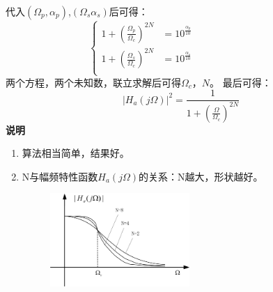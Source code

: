 \documentclass[notheorems,compress,mathserif,table]{beamer}
\begin{document}
\begin{frame}[allowframebreaks]
\begin{enumerate}
    代入$(\Omega_{p},\alpha_{p})$,$(\Omega_{s}\alpha_{s})$后可得：
    $$
    \left\{ \begin{aligned}
        1+\left(\frac{\Omega_{p}}{\Omega_{c}}\right)^{2N} &= 10^{\frac{\alpha_{p}}{10}}\\
        1+\left(\frac{\Omega_{s}}{\Omega_{c}}\right)^{2N} &= 10^{\frac{\alpha_{s}}{10}}
        \quad\quad\quad\quad\quad\quad\quad\quad\\
    \end{aligned} \right.
    $$
    两个方程，两个未知数，联立求解后可得$\Omega_{c}$，$N$。
    最后可得：
    $$|H_{a}(j\Omega)|^{2}= \frac{1}{1+(\frac{\Omega}{\Omega_{c}})^{2N}}$$
    \newpage
    \textbf{说明}
    \begin{enumerate}
      \item 算法相当简单，结果好。
      \item N与幅频特性函数$H_{a}(j\Omega)$的关系：N越大，形状越好。
        \begin{figure}[h]
          \centering
          \includegraphics[width=0.5\textwidth]{fig7_btwsdtfdtx.jpg}
        \end{figure}
    \end{enumerate}
    \end{enumerate}
\end{frame}
\end{document}
